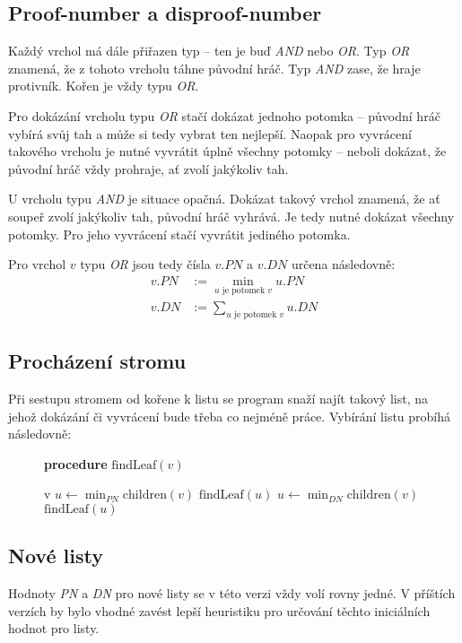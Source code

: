 \documentclass{article}
\begin{document}
\subsection{Proof-number a disproof-number}
Každý vrchol má dále přiřazen typ -- ten je buď \emph{AND} nebo \emph{OR}. Typ \emph{OR} znamená, že z tohoto vrcholu
táhne původní hráč. Typ \emph{AND} zase, že hraje protivník. Kořen je vždy typu \emph{OR}.

Pro dokázání vrcholu typu \emph{OR} stačí dokázat jednoho potomka -- původní hráč vybírá svůj tah a může si tedy vybrat
ten nejlepší. Naopak pro vyvrácení takového vrcholu je nutné vyvrátit úplně všechny potomky -- neboli dokázat, že
původní hráč vždy prohraje, ať zvolí jakýkoliv tah.

U vrcholu typu \emph{AND} je situace opačná. Dokázat takový vrchol znamená, že ať soupeř zvolí jakýkoliv tah, původní
hráč vyhrává. Je tedy nutné dokázat všechny potomky. Pro jeho vyvrácení stačí vyvrátit jediného potomka.

Pro vrchol $v$ typu \emph{OR} jsou tedy čísla $v.PN$ a $v.DN$ určena následovně:
\begin{align*}
	v.PN &:= \min_{u \text{ je potomek $v$}} u.PN \\
	v.DN &:= \sum_{u \text{ je potomek $v$}} u.DN
\end{align*}

\subsection{Procházení stromu}
Při sestupu stromem od kořene k listu se program snaží najít takový list, na jehož dokázání či vyvrácení bude třeba co
nejméně práce. Vybírání listu probíhá následovně:

\begin{figure}[H]
{\bf procedure} $\text{findLeaf}(v)$
\begin{algorithmic}
		 v
		\STATE $u \gets \min_{PN} \text{children}(v)$
		 $\text{findLeaf}(u)$
	\ELSE
		\STATE $u \gets \min_{DN} \text{children}(v)$
		 $\text{findLeaf}(u)$
	\ENDIF
\end{algorithmic}
\end{figure}

\subsection{Nové listy}
Hodnoty \emph{PN} a \emph{DN} pro nové listy se v této verzi vždy volí rovny jedné. V příštích verzích by bylo vhodné
zavést lepší heuristiku pro určování těchto iniciálních hodnot pro listy.
\end{document}
